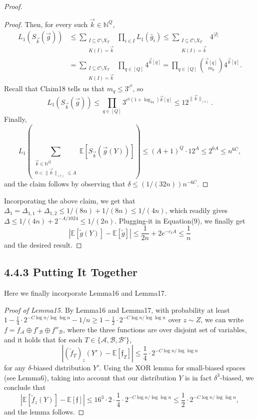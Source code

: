 \documentclass[10pt,a4paper]{article}
\begin{document}
\begin{proof}
\begin{proof}
Then, for every such $\vec k\in\mathbb N^Q$,
\begin{align*}
L_1(S_{\vec k}(\vec g))
&\le\sum_{\substack{I\subseteq\mathcal C\setminus X_T\\K(I)=\vec k}}\prod_{i\in I}L_1(\widehat g_i)
\le\sum_{\substack{I\subseteq\mathcal C\setminus X_T\\K(I)=\vec k}}4^{|I|}\\
&=\sum_{\substack{I\subseteq\mathcal C\setminus X_T\\K(I)=\vec k}}\prod_{q\in[Q]}4^{\vec k[q]}
=\prod_{q\in[Q]}\binom{\vec k[q]}{m_q}4^{\vec k[q]}.
\end{align*}
Recall that Claim18 tells us that $m_q\le3^{c^q}$, so
\begin{equation}
L_1(S_{\vec k}(\vec g))\le\prod_{q\in[Q]}3^{c^q(1+\log_34)\vec k[q]}\le12^{\|\vec k\|_{(c)}}.\tag{12}
\end{equation}
Finally,
\[
L_1\left(\sum_{\substack{\vec k\in\mathbb N^Q\\0<\|\vec k\|_{(c)}\le A}}\mathbb E[S_{\vec k}(\vec g(Y))]\right)
\le(A+1)^Q\cdot12^A\le2^{6A}\le n^{6\bar C},
\]
and the claim follows by observing that $\delta\le(1/(32n))n^{-6\bar C}$.
\end{proof}
Incorporating the above claim, we get that $\Delta_1=\Delta_{1,1}+\Delta_{1,2}\le1/(8n)+1/(8n)\le1/(4n)$, which readily gives $\Delta\le1/(4n)+2^{-A/1024}\le1/(2n)$. Plugging-it in Equation(9), we finally get
\[
|\mathbb E[\widetilde g(Y)]-\mathbb E[\widetilde g]|
\le\frac1{2n}+2e^{-c_IA}\le\frac1n
\]
and the desired result.
\end{proof}

\subsection*{4.4.3 Putting It Together}
Here we finally incorporate Lemma16 and Lemma17.
\begin{proof}[Proof of Lemma15]
By Lemma16 and Lemma17, with probability at least $1-\frac14\cdot2^{-C\log n/\log\log n}-1/n\ge1-\frac12\cdot2^{-C\log n/\log\log n}$ over $z\sim Z$, we can write $f=f_{\mathcal A}\oplus f'_{\mathcal B}\oplus f''_{\mathcal B}$, where the three functions are over disjoint set of variables, and it holds that for each $T\in\{\mathcal A,\mathcal B,\mathcal B'\}$,
\[
|(\widetilde f_T)_z(Y')-\mathbb E[\mathfrak f_T]|
\le\frac14\cdot2^{-C\log n/\log\log n}
\]
for any $\delta$-biased distribution $Y'$. Using the XOR lemma for small-biased spaces (see Lemma6), taking into account that our distribution $Y$ is in fact $\delta^3$-biased, we conclude that
\[
|\mathbb E[\widetilde f_z(Y)]-\mathbb E[\mathfrak f]|
\le16^3\cdot2\cdot\frac14\cdot2^{-C\log n/\log\log n}
\le\frac12\cdot2^{-C\log n/\log\log n},
\]
and the lemma follows.
\end{proof}
\end{document}
